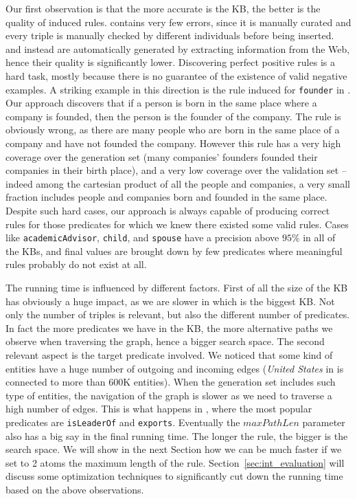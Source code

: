 Our first observation is that the more accurate is the KB, the better is the quality of induced rules. \wikidata contains very few errors, since it is manually curated and every triple is manually checked by different individuals before being inserted. \dbpedia and \yago instead are automatically generated by extracting information from the Web, hence their quality is significantly lower. Discovering perfect positive rules is a hard task, mostly because there is no guarantee of the existence of valid negative examples. A striking example in this direction is the rule induced for \texttt{founder} in \dbpedia. Our approach discovers that if a person is born in the same place where a company is founded, then the person is the founder of the company. The rule is obviously wrong, as there are many people who are born in the same place of a company and have not founded the company. However this rule has a very high coverage over the generation set (many companies' founders founded their companies in their birth place), and a very low coverage over the validation set -- indeed among the cartesian product of all the people and companies, a very small fraction includes people and companies born and founded in the same place. Despite such hard cases, our approach is always capable of producing correct rules for those predicates for which we knew there existed some valid rules. Cases like \texttt{academicAdvisor}, \texttt{child}, and \texttt{spouse} have a precision above $95\%$ in all of the KBs, and final values are brought down by few predicates where meaningful rules probably do not exist at all.

The running time is influenced by different factors. First of all the size of the KB has obviously a huge impact, as we are slower in \wikidata which is the biggest KB. Not only the number of triples is relevant, but also the different number of predicates. In fact the more predicates we have in the KB, the more alternative paths we observe when traversing the graph, hence a bigger search space. The second relevant aspect is the target predicate involved. We noticed that some kind of entities have a huge number of outgoing and incoming edges (\textit{United States} in \wikidata is connected to more than 600K entities). When the generation set includes such type of entities, the navigation of the graph is slower as we need to traverse a high number of edges. This is what happens in \yago, where the most popular predicates are \texttt{isLeaderOf} and \texttt{exports}. Eventually the $maxPathLen$ parameter also has a big say in the final running time. The longer the rule, the bigger is the search space. We will show in the next Section how we can be much faster if we set to 2 atoms the maximum length of the rule. Section~\ref{sec:int_evaluation} will discuss some optimization techniques to significantly cut down 	the running time based on the above observations.

